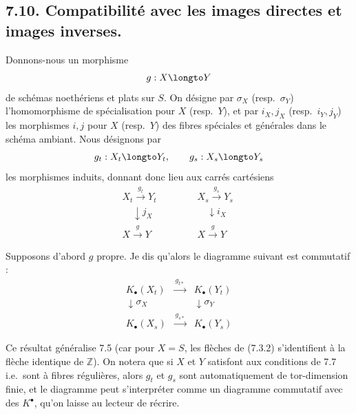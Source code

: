 \subsection*{7.10. Compatibilit\'e avec les images directes et images inverses.}

Donnons-nous un morphisme
\[
g : X \longto Y
\]
de sch\'emas noeth\'eriens et plats sur $S$. On d\'esigne par $\sigma_{X}$ (resp.\ $\sigma_{Y}$) l'homomorphisme de sp\'ecialisation pour $X$ (resp.\ $Y$), et par $i_{X}, j_{X}$ (resp.\ $i_{Y}, j_{Y}$) les morphismes $i, j$ pour $X$ (resp.\ $Y$) des fibres sp\'eciales et g\'en\'erales dans le sch\'ema ambiant. Nous d\'esignons par
\[
g_{t} : X_{t} \longto Y_{t}, \qquad g_{s} : X_{s} \longto Y_{s}
\]
les morphismes induits, donnant donc lieu aux carr\'es cart\'esiens
\begin{equation}\label{eq:7.10.0}
\begin{array}{ccc}
X_{t} \xrightarrow{\,g_{t}\,} Y_{t} & \qquad & X_{s} \xrightarrow{\,g_{s}\,} Y_{s} \\
\phantom{\scriptstyle j_{X}} \downarrow{\scriptstyle j_{X}} \phantom{\scriptstyle j_{X}} & & \phantom{\scriptstyle i_{X}} \downarrow{\scriptstyle i_{X}} \phantom{\scriptstyle i_{X}} \\
X \xrightarrow{\,g\,} Y & & X \xrightarrow{\,g\,} Y
\end{array}
\end{equation}

Supposons d'abord $g$ propre. Je dis qu'alors le diagramme suivant est commutatif :
\begin{equation}\label{eq:7.10.1}
\begin{array}{ccc}
K_{\bullet}(X_{t}) & \xrightarrow{\,g_{t*}\,} & K_{\bullet}(Y_{t}) \\
\downarrow{\scriptstyle \sigma_{X}} & & \downarrow{\scriptstyle \sigma_{Y}} \\
K_{\bullet}(X_{s}) & \xrightarrow{\,g_{s*}\,} & K_{\bullet}(Y_{s})
\end{array}
\end{equation}

Ce r\'esultat g\'en\'eralise 7.5 (car pour $X = S$, les fl\`eches de (7.3.2) s'identifient \`a la fl\`eche identique de $\mathbb{Z}$). On notera que si $X$ et $Y$ satisfont aux conditions de 7.7 i.e.\ sont \`a fibres r\'eguli\`eres, alors $g_{t}$ et $g_{s}$ sont automatiquement de tor-dimension finie, et le diagramme peut s'interpr\'eter comme un diagramme commutatif avec des $K^{\bullet}$, qu'on laisse au lecteur de r\'ecrire.

